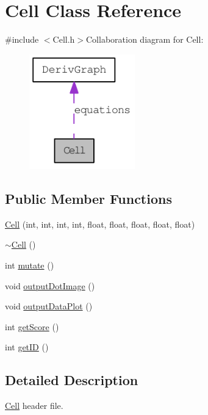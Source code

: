 \hypertarget{classCell}{
\section{Cell Class Reference}
\label{classCell}
}


{\ttfamily \#include $<$Cell.h$>$}Collaboration diagram for Cell:\nopagebreak
\begin{figure}[H]
\begin{center}
\leavevmode
\includegraphics[width=130pt]{classCell__coll__graph}
\end{center}
\end{figure}
\subsection*{Public Member Functions}
\begin{DoxyCompactItemize}
\item 
\hyperlink{classCell_af85b728fb894b346b654eea910958180}{Cell} (int, int, int, int, float, float, float, float, float)
\item 
\hyperlink{classCell_a9fa559f7a28e2b4336c6879ca09304d8}{$\sim$Cell} ()
\item 
int \hyperlink{classCell_a555fa98c5f1dc8d7c88c7a24f69994ff}{mutate} ()
\item 
void \hyperlink{classCell_a535ddddc0471fa874a0b22a54bd38c1a}{outputDotImage} ()
\item 
void \hyperlink{classCell_a8e117526c56dda4d0d56d840d1558835}{outputDataPlot} ()
\item 
int \hyperlink{classCell_a3fbb8b244cc5c516d0728a987d07bf0f}{getScore} ()
\item 
int \hyperlink{classCell_a6fb5e28360b3a6e53400af8b950f6203}{getID} ()
\end{DoxyCompactItemize}


\subsection{Detailed Description}
\hyperlink{classCell}{Cell} header file. 

